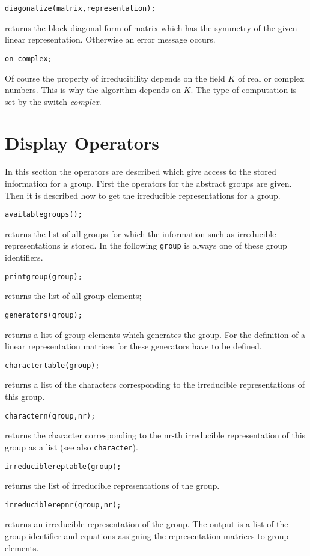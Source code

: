 {\tt diagonalize(matrix,representation);}

returns the block diagonal form of matrix which has the symmetry 
of the given linear representation. Otherwise an error message occurs.

{\tt on complex;}

Of course the property of irreducibility depends on the field $K$ of
real or complex numbers. This is why the algorithm depends on $K$. 
The type of computation is set by the switch {\em complex}.

\section{Display Operators}

In this section the operators are described which give access to the
stored information for a group.
First the operators for the abstract groups are given.
Then it is described how to get the irreducible representations
for a group.

{\tt availablegroups();}

returns the list of all groups for which the information such as 
irreducible representations is stored. In the following {\tt group}
is always one of these group identifiers. 

{\tt printgroup(group);}

returns the list of all group elements;

{\tt generators(group);}

returns a list of group elements which generates the group. For the 
definition of a linear representation matrices for these generators
have to be defined.

{\tt charactertable(group);}

returns a list of the characters corresponding to the irreducible
representations of this group.

{\tt charactern(group,nr);}

returns the character corresponding to the nr-th irreducible representation
of this group as a list (see also {\tt character}).

{\tt irreduciblereptable(group);}

returns the list of irreducible representations of the group.

{\tt irreduciblerepnr(group,nr);}

returns an irreducible representation of the group. The output
is a list of the group identifier and equations 
assigning the representation matrices to group elements.

